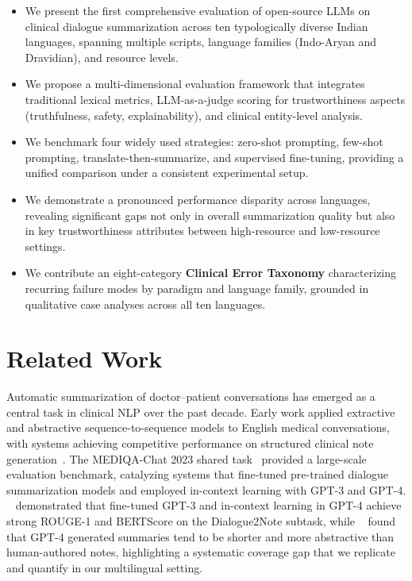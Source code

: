\documentclass[conference]{IEEEtran}
\begin{document}
\begin{itemize}
  \item We present the first comprehensive evaluation of open-source LLMs
  on clinical dialogue summarization across ten typologically diverse Indian
  languages, spanning multiple scripts, language families (Indo-Aryan and
  Dravidian), and resource levels.

  \item We propose a multi-dimensional evaluation framework that integrates
  traditional lexical metrics, LLM-as-a-judge scoring for trustworthiness
  aspects (truthfulness, safety, explainability), and clinical entity-level
  analysis.

  \item We benchmark four widely used strategies: zero-shot prompting,
  few-shot prompting, translate-then-summarize, and supervised fine-tuning,
  providing a unified comparison under a consistent experimental setup.

  \item We demonstrate a pronounced performance disparity across languages,
  revealing significant gaps not only in overall summarization quality but
  also in key trustworthiness attributes between high-resource and
  low-resource settings.

  \item We contribute an eight-category \textbf{Clinical Error Taxonomy}
  characterizing recurring failure modes by paradigm and language family,
  grounded in qualitative case analyses across all ten languages.
\end{itemize}

\section{Related Work}

Automatic summarization of doctor--patient conversations has emerged as a
central task in clinical NLP over the past decade. Early work applied
extractive and abstractive sequence-to-sequence models to English medical
conversations, with systems achieving competitive performance on structured
clinical note generation~\cite{joshi2020dr,abacha2023empirical}. The
MEDIQA-Chat 2023 shared task~\cite{abacha2023overview} provided a
large-scale evaluation benchmark, catalyzing systems that fine-tuned
pre-trained dialogue summarization models and employed in-context learning
with GPT-3 and GPT-4. \citeauthor{tang2023gersteinlab}~\cite{tang2023gersteinlab}
demonstrated that fine-tuned GPT-3 and in-context learning in GPT-4 achieve
strong ROUGE-1 and BERTScore on the Dialogue2Note subtask, while
\citeauthor{mathur2023summqa}~\cite{mathur2023summqa} found that GPT-4
generated summaries tend to be shorter and more abstractive than
human-authored notes, highlighting a systematic coverage gap that we
replicate and quantify in our multilingual setting.
\end{document}

